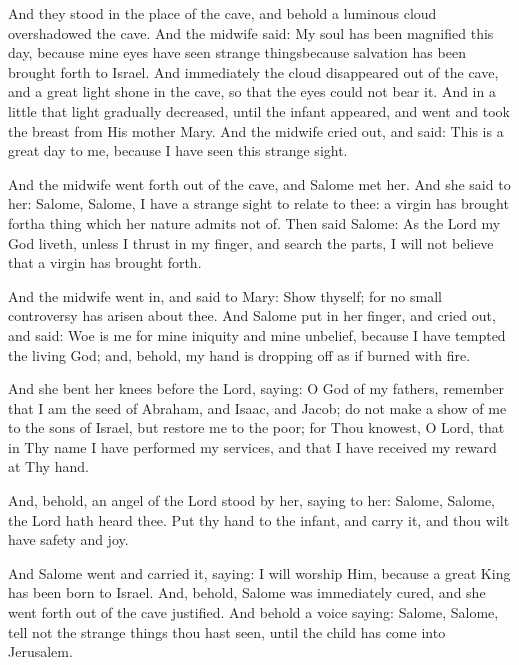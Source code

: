 \pend\pstart
And they stood in the place of the cave, and behold a luminous cloud overshadowed the cave. And the midwife said: My soul has been magnified this day, because mine eyes have seen strange things\textemdash because salvation has been brought forth to Israel. And immediately the cloud disappeared out of the cave, and a great light shone in the cave, so that the eyes could not bear it. And in a little that light gradually decreased, until the infant appeared, and went and took the breast from His mother Mary. And the midwife cried out, and said: This is a great day to me, because I have seen this strange sight.

\pend\pstart
And the midwife went forth out of the cave, and Salome met her. And she said to her: Salome, Salome, I have a strange sight to relate to thee: a virgin has brought forth\textemdash a thing which her nature admits not of. Then said Salome: As the Lord my God liveth, unless I thrust in my finger, and search the parts, I will not believe that a virgin has brought forth.

\pend\pstart
{}

\pend\setcounter{pstartR}{1}\pstart
And the midwife went in, and said to Mary: Show thyself; for no small controversy has arisen about thee. And Salome put in her finger, and cried out, and said: Woe is me for mine iniquity and mine unbelief, because I have tempted the living God; and, behold, my hand is dropping off as if burned with fire.

\pend\pstart
And she bent her knees before the Lord, saying: O God of my fathers, remember that I am the seed of Abraham, and Isaac, and Jacob; do not make a show of me to the sons of Israel, but restore me to the poor; for Thou knowest, O Lord, that in Thy name I have performed my services, and that I have received my reward at Thy hand.

\pend\pstart
And, behold, an angel of the Lord stood by her, saying to her: Salome, Salome, the Lord hath heard thee. Put thy hand to the infant, and carry it, and thou wilt have safety and joy.

\pend\pstart
And Salome went and carried it, saying: I will worship Him, because a great King has been born to Israel. And, behold, Salome was immediately cured, and she went forth out of the cave justified. And behold a voice saying: Salome, Salome, tell not the strange things thou hast seen, until the child has come into Jerusalem.

\pend\pstart
{}

